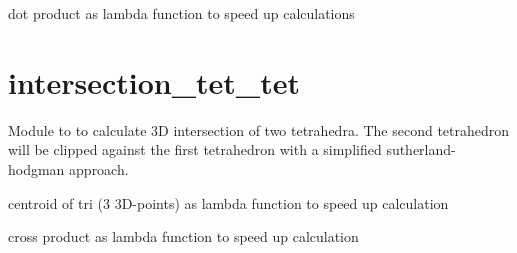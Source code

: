 \documentclass[letterpaper,10pt,english]{sphinxmanual}
\begin{document}

\begin{fulllineitems}
\label{\detokenize{pk_src.collision_tet_tet:pk_src.collision_tet_tet.dot}}
dot product as lambda function to speed up calculations

\end{fulllineitems}



\section{intersection\_tet\_tet}
\label{\detokenize{pk_src.intersection_tet_tet:intersection-tet-tet}}\label{\detokenize{pk_src.intersection_tet_tet::doc}}\label{\detokenize{pk_src.intersection_tet_tet:id1}}
{\hyperref[\detokenize{index:sec-misc}]{}}
\label{\detokenize{pk_src.intersection_tet_tet:module-pk_src.intersection_tet_tet}}
Module to to calculate 3D intersection of two tetrahedra.
The second tetrahedron will be clipped against the first tetrahedron with a simplified sutherland-hodgman approach.

\begin{fulllineitems}
\label{\detokenize{pk_src.intersection_tet_tet:pk_src.intersection_tet_tet.centroid_tri}}
centroid of tri (3 3D-points) as lambda function to speed up calculation

\end{fulllineitems}


\begin{fulllineitems}
\label{\detokenize{pk_src.intersection_tet_tet:pk_src.intersection_tet_tet.cross}}
cross product as lambda function to speed up calculation

\end{fulllineitems}

\end{document}
